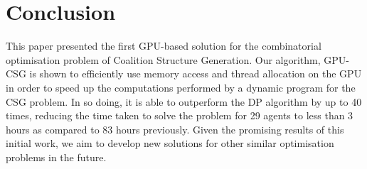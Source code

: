\documentclass{llncs}
\begin{document}
\section{Conclusion}
This paper presented the first GPU-based solution for the combinatorial optimisation problem of Coalition Structure Generation. Our algorithm, GPU-CSG is shown to efficiently use memory access and thread allocation on the GPU in order to speed up the computations performed by a dynamic program for the CSG problem. In so doing, it is able to outperform the DP algorithm by up to 40 times, reducing the time taken to solve the problem for 29 agents to less than 3 hours as compared to 83 hours previously. Given the promising results of this initial work, we  aim to develop new solutions for other similar optimisation problems in the future.

\end{document}
